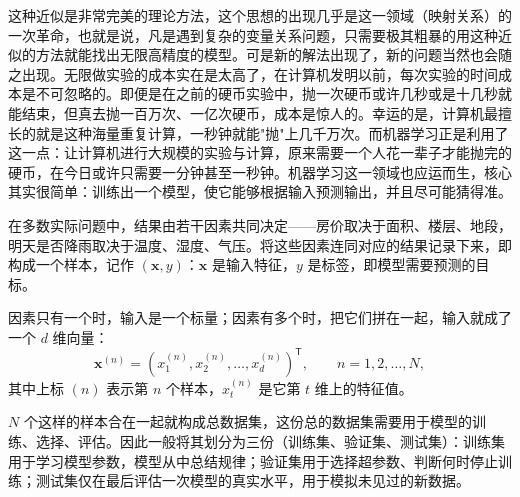 \documentclass[UTF8,a4paper,12pt]{ctexart}
\numberwithin{equation}{section}
\begin{document}
	这种近似是非常完美的理论方法，这个思想的出现几乎是这一领域（映射关系）的一次革命，也就是说，凡是遇到复杂的变量关系问题，只需要极其粗暴的用这种近似的方法就能找出无限高精度的模型。可是新的解法出现了，新的问题当然也会随之出现。无限做实验的成本实在是太高了，在计算机发明以前，每次实验的时间成本是不可忽略的。即便是在之前的硬币实验中，抛一次硬币或许几秒或是十几秒就能结束，但真去抛一百万次、一亿次硬币，成本是惊人的。幸运的是，计算机最擅长的就是这种海量重复计算，一秒钟就能"抛"上几千万次。而机器学习正是利用了这一点：让计算机进行大规模的实验与计算，原来需要一个人花一辈子才能抛完的硬币，在今日或许只需要一分钟甚至一秒钟。机器学习这一领域也应运而生，核心其实很简单：训练出一个模型，使它能够根据输入预测输出，并且尽可能猜得准。

	在多数实际问题中，结果由若干因素共同决定——房价取决于面积、楼层、地段，明天是否降雨取决于温度、湿度、气压。将这些因素连同对应的结果记录下来，即构成一个样本，记作 $(\bm{x},y)$：$\bm{x}$ 是输入特征，$y$ 是标签，即模型需要预测的目标。

	因素只有一个时，输入是一个标量；因素有多个时，把它们拼在一起，输入就成了一个 $d$ 维向量：
	\begin{equation}\label{eq:1.2}
	\bm{x}^{(n)}
	=\left(x_1^{(n)},x_2^{(n)},\ldots,x_d^{(n)}\right)^{\mathsf{T}},
	\qquad n=1,2,\ldots,N,
	\end{equation}
	其中上标 $(n)$ 表示第 $n$ 个样本，$x_t^{(n)}$ 是它第 $t$ 维上的特征值。

	$N$ 个这样的样本合在一起就构成总数据集，这份总的数据集需要用于模型的训练、选择、评估。因此一般将其划分为三份（训练集、验证集、测试集）：训练集用于学习模型参数，模型从中总结规律；验证集用于选择超参数、判断何时停止训练；测试集仅在最后评估一次模型的真实水平，用于模拟未见过的新数据。
	
\end{document}
